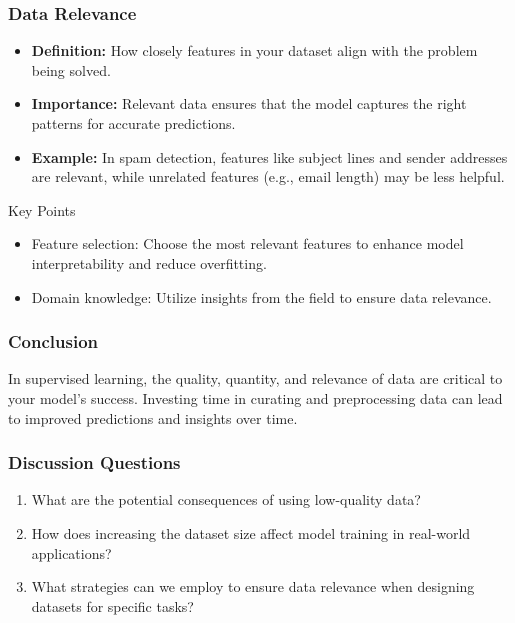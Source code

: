 \documentclass[aspectratio=169]{beamer}
\begin{document}
\begin{frame}[fragile]
    \frametitle{Data Relevance}
    \begin{itemize}
        \item \textbf{Definition:} How closely features in your dataset align with the problem being solved.
        \item \textbf{Importance:} Relevant data ensures that the model captures the right patterns for accurate predictions.
        \item \textbf{Example:} In spam detection, features like subject lines and sender addresses are relevant, while unrelated features (e.g., email length) may be less helpful.
    \end{itemize}
    \begin{block}{Key Points}
        \begin{itemize}
            \item Feature selection: Choose the most relevant features to enhance model interpretability and reduce overfitting.
            \item Domain knowledge: Utilize insights from the field to ensure data relevance.
        \end{itemize}
    \end{block}
\end{frame}

\begin{frame}[fragile]
    \frametitle{Conclusion}
    In supervised learning, the quality, quantity, and relevance of data are critical to your model's success. Investing time in curating and preprocessing data can lead to improved predictions and insights over time.
\end{frame}

\begin{frame}[fragile]
    \frametitle{Discussion Questions}
    \begin{enumerate}
        \item What are the potential consequences of using low-quality data?
        \item How does increasing the dataset size affect model training in real-world applications?
        \item What strategies can we employ to ensure data relevance when designing datasets for specific tasks?
    \end{enumerate}
\end{frame}
\end{document}
